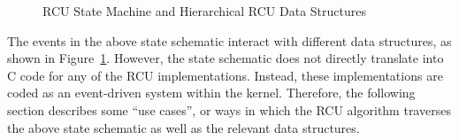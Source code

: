 \begin{figure}[htb]
\begin{center}
\end{center}
\caption{RCU State Machine and Hierarchical RCU Data Structures}
\label{fig:app:rcuimpl:rcutree:RCU State Machine and Hierarchical RCU Data Structures}
\end{figure}

The events in the above state schematic interact with different
data structures, as shown in
Figure~\ref{fig:app:rcuimpl:rcutree:RCU State Machine and Hierarchical RCU Data Structures}.
However, the state schematic does not directly translate into C code
for any of the RCU implementations.
Instead, these implementations are coded as an event-driven system within
the kernel.
Therefore, the following section describes some ``use cases'',
or ways in which the RCU algorithm traverses the above state schematic
as well as the relevant data structures.

